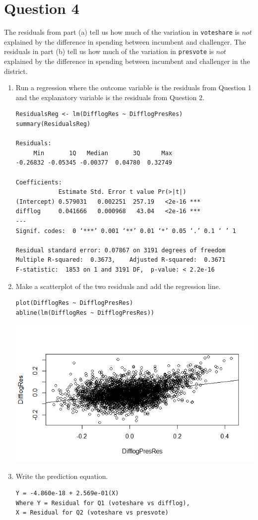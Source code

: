 \documentclass[12pt,letterpaper]{article}
\begin{document}
\newpage	
\section*{Question 4}
\noindent The residuals from part (a) tell us how much of the variation in \texttt{voteshare} is $not$ explained by the difference in spending between incumbent and challenger. The residuals in part (b) tell us how much of the variation in \texttt{presvote} is $not$ explained by the difference in spending between incumbent and challenger in the district.
	\begin{enumerate}
		\item Run a regression where the outcome variable is the residuals from Question 1 and the explanatory variable is the residuals from Question 2.
\begin{verbatim}
ResidualsReg <- lm(DifflogRes ~ DifflogPresRes)
summary(ResidualsReg)

Residuals:
     Min       1Q   Median       3Q      Max 
-0.26832 -0.05345 -0.00377  0.04780  0.32749 

Coefficients:
            Estimate Std. Error t value Pr(>|t|)    
(Intercept) 0.579031   0.002251  257.19   <2e-16 ***
difflog     0.041666   0.000968   43.04   <2e-16 ***
---
Signif. codes:  0 ‘***’ 0.001 ‘**’ 0.01 ‘*’ 0.05 ‘.’ 0.1 ‘ ’ 1

Residual standard error: 0.07867 on 3191 degrees of freedom
Multiple R-squared:  0.3673,	Adjusted R-squared:  0.3671 
F-statistic:  1853 on 1 and 3191 DF,  p-value: < 2.2e-16
\end{verbatim}
\vspace{6cm}
		\item Make a scatterplot of the two residuals and add the regression line. 
\begin{verbatim}
plot(DifflogRes ~ DifflogPresRes)
abline(lm(DifflogRes ~ DifflogPresRes))
\end{verbatim}
\includegraphics[width=.75\textwidth]{Rplot4}
\vspace{6cm}
		\item Write the prediction equation.
\begin{verbatim}
Y = -4.860e-18 + 2.569e-01(X)
Where Y = Residual for Q1 (voteshare vs difflog),
X = Residual for Q2 (voteshare vs presvote)
\end{verbatim}
	\end{enumerate}
	
\end{document}

